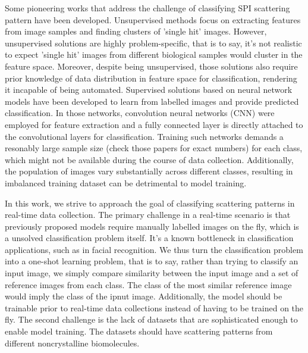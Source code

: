 Some pioneering works that address the challenge of classifying SPI scattering
pattern have been developed.  Unsupervised methods
\cite{yoonUnsupervisedClassificationSingleparticle2011,
giannakisSymmetriesImageFormation2012,schwanderSymmetriesImageFormation2012,
yoonNovelAlgorithmsCoherent2012,
andreassonAutomatedIdentificationClassification2014,
bobkovSortingAlgorithmsSingleparticle2015a} focus on extracting features from
image samples and finding clusters of 'single hit' images.  However,
unsupervised solutions are highly problem-specific, that is to say, it's not
realistic to expect 'single hit' images from different biological samples would
cluster in the feature space.  Moreover, despite being unsupervised, those
solutions also require prior knowledge of data distribution in feature space for
classification, rendering it incapable of being automated. Supervised solutions
based on neural network models \cite{shiEvaluationPerformanceClassification2019,
ignatenkoClassificationDiffractionPatterns2021} have been developed to learn
from labelled images and provide predicted classification.  In those networks,
convolution neural networks (CNN) were employed for feature extraction and a
fully connected layer is directly attached to the convolutional layers for
classification.  Training such networks demands a resonably large sample size
{\color{red}(check those papers for exact numbers)} for each class, which might
not be available during the course of data collection. Additionally, the
population of images vary substantially across different classes, resulting in
imbalanced training dataset can be detrimental to model training.  



In this work, we strive to approach the goal of classifying scattering patterns
in real-time data collection.  The primary challenge in a real-time scenario is
that previously proposed models require manually labelled images on the fly,
which is a unsolved classification problem itself.  It's a known bottleneck in
classification applications, such as in facial recognition.  We thus turn the
classification problem into a one-shot learning problem, that is to say, rather
than trying to classify an input image, we simply compare similarity between the
input image and a set of reference images from each class.  The class of the
most similar reference image would imply the class of the ipnut image.
Additionally, the model should be trainable prior to real-time data collections
instead of having to be trained on the fly. The second challenge is the lack of
datasets that are sophisticated enough to enable model training.  The datasets
should have scattering patterns from different noncrystalline biomolecules.  

